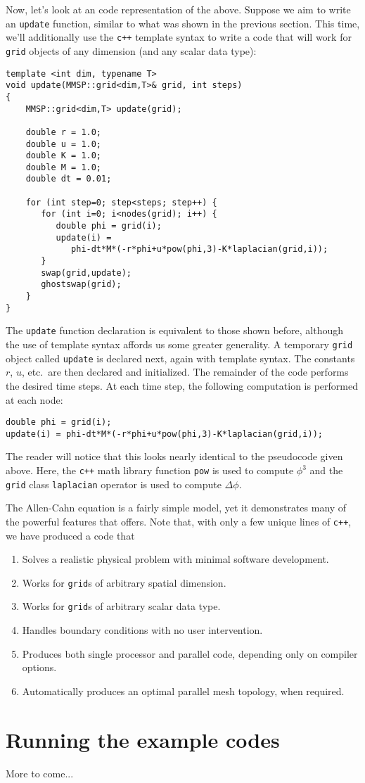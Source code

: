 Now, let's look at an \MMSP code representation of the above.  Suppose we aim to write an {\tt update} function, similar to what was shown in the previous section.  This time, we'll additionally use the {\tt c++} template syntax to write a code that will work for {\tt grid} objects of any dimension (and any scalar data type):
\begin{shadebox}
\begin{verbatim}
template <int dim, typename T>
void update(MMSP::grid<dim,T>& grid, int steps)
{
    MMSP::grid<dim,T> update(grid);

    double r = 1.0;
    double u = 1.0;
    double K = 1.0;
    double M = 1.0;
    double dt = 0.01;

    for (int step=0; step<steps; step++) {
       for (int i=0; i<nodes(grid); i++) {
          double phi = grid(i);
          update(i) =
             phi-dt*M*(-r*phi+u*pow(phi,3)-K*laplacian(grid,i));
       }
       swap(grid,update);
       ghostswap(grid);
    }
}
\end{verbatim}
\end{shadebox}
The {\tt update} function declaration is equivalent to those shown before, although the use of template syntax affords us some greater generality.  A temporary {\tt grid} object called {\tt update} is declared next, again with template syntax.  The constants $r$, $u$, etc.\ are then declared and initialized.  The remainder of the code performs the desired time steps.  At each time step, the following computation is performed at each node:
\begin{shadebox}
\begin{verbatim}
double phi = grid(i);
update(i) = phi-dt*M*(-r*phi+u*pow(phi,3)-K*laplacian(grid,i));
\end{verbatim}
\end{shadebox}
The reader will notice that this looks nearly identical to the pseudocode given above.  Here, the {\tt c++} math library function {\tt pow} is used to compute $\phi^3$ and the {\tt grid} class {\tt laplacian} operator is used to compute $\Delta \phi$.

The Allen-Cahn equation is a fairly simple model, yet it demonstrates many of the powerful features that \MMSP offers.  Note that, with only a few unique lines of {\tt c++}, we have produced a code that
\begin{enumerate}
\item{Solves a realistic physical problem with minimal software development.}
\item{Works for {\tt grid}s of arbitrary spatial dimension.}
\item{Works for {\tt grid}s of arbitrary scalar data type.}
\item{Handles boundary conditions with no user intervention.}
\item{Produces both single processor and parallel code, depending only on compiler options.}
\item{Automatically produces an optimal parallel mesh topology, when required.}
\end{enumerate}


\section{Running the example codes}
More to come...




